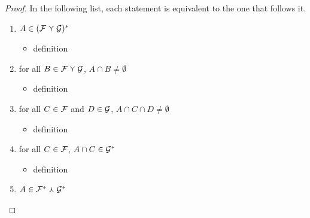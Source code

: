 \begin{proof}
    

    
    
     In the following list, each statement is equivalent to the one that follows it.
    \begin{enumerate}
        \item $A \in (\mathcal{F} \curlyvee \mathcal{G})^*$
        \begin{itemize}
            \item[--] definition
        \end{itemize}
        \item for all $B \in \mathcal{F} \curlyvee \mathcal{G}$, $A \cap B \neq \emptyset$
        \begin{itemize}
            \item[--] definition
        \end{itemize}
        \item for all $C \in \mathcal{F}$ and $D \in \mathcal{G}$, $A \cap C \cap D \neq \emptyset$
        \begin{itemize}
            \item[--] definition
        \end{itemize}
        \item for all $C \in \mathcal{F}$, $A \cap C \in \mathcal{G}^*$
        \begin{itemize}
            \item[--] definition
        \end{itemize}
        \item $A \in \mathcal{F}^* \curlywedge \mathcal{G}^*$
    \end{enumerate}
\end{proof}

